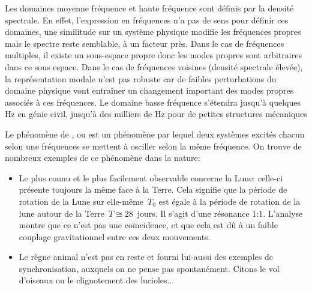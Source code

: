 Les domaines moyenne fréquence et haute fréquence sont définis par la densité spectrale. En effet, l'expression en fréquences n'a pas de sens pour définir ces domaines, une similitude sur un système physique modifie les fréquences propres mais le spectre reste semblable, à un facteur près. Dans le cas de fréquences multiples, il existe un sous-espace propre donc les modes propres sont arbitraires dans ce sous espace. Dans le cas de fréquences voisines (densité spectrale élevée), la représentation modale n'est pas robuste car de faibles perturbations du domaine physique vont entraîner un changement important des modes propres associés à ces fréquences.  Le domaine basse fréquence s'étendra jusqu'à quelques Hz en génie civil, jusqu'à des milliers de Hz pour de petites structures mécaniques

\medskip
Le phénomène de , ou  est un phénomène par lequel deux systèmes excités chacun selon une fréquences se mettent à osciller selon la même fréquence. On trouve de nombreux exemples de ce phénomène dans la nature:
\begin{itemize}
  \item Le plus connu et le plus facilement observable concerne la Lune: celle-ci présente toujours la même face à la Terre. Cela signifie que la période de rotation de la Lune sur elle-même~$T_0$ est égale à la période de rotation de la lune autour de la Terre~$T\cong 28$~jours. Il s'agit d'une résonance 1:1. L'analyse montre que ce n'est pas une coïncidence, et que cela est dû à un faible couplage gravitationnel entre ces deux mouvements.

  \item Le règne animal n'est pas en reste et fourni lui-aussi des exemples de synchronisation, auxquels on ne pense pas spontanément. Citons le vol d'oiseaux ou le clignotement des lucioles...
\end{itemize}

